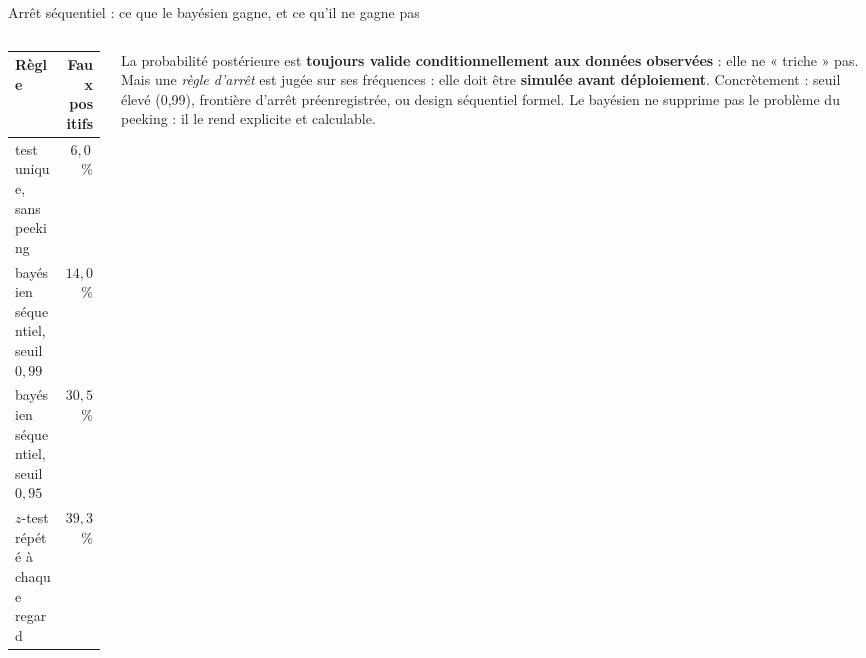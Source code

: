 \begin{frame}{Arrêt séquentiel : ce que le bayésien gagne, et ce qu'il ne gagne pas}

\vspace{-1mm}
\begin{columns}[t]
\begin{column}{0.55\textwidth}
\begin{ebox}[Simulation réelle sous $H_0$ ($p_A = p_B = 0{,}10$), 400 expériences]
\begin{tabular}{@{}lr@{}}
\toprule
Règle & Faux positifs \\
\midrule
test unique, sans peeking & $6{,}0$\,\% \\
bayésien séquentiel, seuil $0{,}99$ & $14{,}0$\,\% \\
bayésien séquentiel, seuil $0{,}95$ & $30{,}5$\,\% \\
$z$-test répété à chaque regard & $39{,}3$\,\% \\
\bottomrule
\end{tabular}
\end{ebox}
\end{column}
\begin{column}{0.43\textwidth}
\begin{kbox}
La probabilité postérieure est \textbf{toujours valide conditionnellement
aux données observées} : elle ne « triche » pas. Mais une \emph{règle
d'arrêt} est jugée sur ses fréquences : elle doit être
\textbf{simulée avant déploiement}.
\vspace{1mm}
\footnotesize Concrètement : seuil élevé (0,99), frontière d'arrêt
préenregistrée, ou design séquentiel formel. Le bayésien ne supprime pas
le problème du peeking : il le rend explicite et calculable.
\end{kbox}
\end{column}
\end{columns}
\end{frame}

